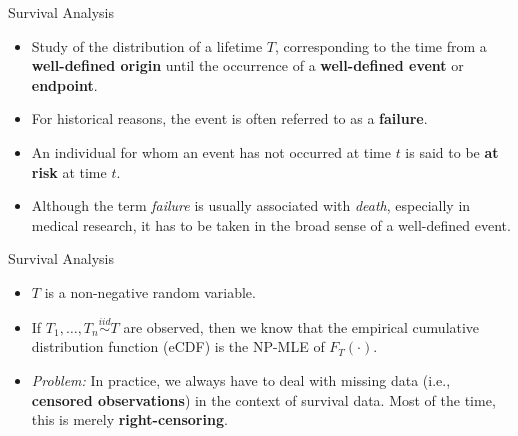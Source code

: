 \documentclass[12pt,t]{beamer}
\begin{document}
\begin{frame}[c]{Survival Analysis}

\begin{center}
\begin{itemize}
  \itemsep12pt
  \item Study of the distribution of a lifetime $T$, corresponding to the time
    from a \textbf{well-defined origin} until the occurrence of a
    \textbf{well-defined event} or \textbf{endpoint}.
  \item For historical reasons, the event is often referred to as a
    \textbf{failure}.
  \item An individual for whom an event has not occurred at time $t$ is said to
    be \textbf{at risk} at time $t$.
  \item Although the term \textit{failure} is usually associated with
    \textit{death}, especially in medical research, it has to be taken in the
    broad sense of a well-defined event.
\end{itemize}
\end{center}

\note{
}

\end{frame}


\begin{frame}[c]{Survival Analysis}

\begin{center}
\begin{itemize}
  \itemsep12pt
  \item $T$ is a non-negative random variable.
  \item If $T_1, \ldots, T_n \stackrel{iid}{\sim} T$ are observed, then we know
    that the empirical cumulative distribution function (eCDF) is the NP-MLE of
    $F_T(\cdot).$
  \item \textit{Problem:} In practice, we always have to deal with missing data
    (i.e., \textbf{censored observations}) in the context of survival data. Most
    of the time, this is merely \textbf{right-censoring}.
\end{itemize}
\end{center}


\end{frame}
\end{document}
